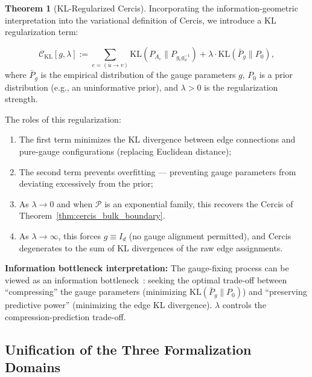 \documentclass[12pt,a4paper]{article}
\theoremstyle{definition}
\newtheorem{theorem}{Theorem}[section]
\theoremstyle{remark}
\theoremstyle{definition}
\newcommand{\cercis}{\mathcal{C}}
\newcommand{\KL}{\mathrm{KL}}
\begin{document}
\begin{theorem}[KL-Regularized Cercis]\label{thm:kl_regularized_cercis}
Incorporating the information-geometric interpretation into the variational definition of Cercis, we introduce a KL regularization term:

\[
    \cercis_{\text{KL}}[g, \lambda] := \sum_{e=(u \to v)} \KL(P_{A_e} \| P_{g_v g_u^{-1}}) + \lambda \cdot \KL(\bar{P}_g \| P_0),
\]
where $\bar{P}_g$ is the empirical distribution of the gauge parameters $g$, $P_0$ is a prior distribution (e.g., an uninformative prior),
and $\lambda > 0$ is the regularization strength.

The roles of this regularization:
\begin{enumerate}[label=(\roman*)]
    \item The first term minimizes the KL divergence between edge connections and pure-gauge configurations (replacing Euclidean distance);
    \item The second term prevents overfitting — preventing gauge parameters from deviating excessively from the prior;
    \item As $\lambda \to 0$ and when $\mathcal{P}$ is an exponential family, this recovers the Cercis of Theorem~\ref{thm:cercis_bulk_boundary}.
    \item As $\lambda \to \infty$, this forces $g \equiv I_d$ (no gauge alignment permitted),
    and Cercis degenerates to the sum of KL divergences of the raw edge assignments.
\end{enumerate}

\textbf{Information bottleneck interpretation:} The gauge-fixing process can be viewed as an information bottleneck~\cite{tishby2000}: seeking the optimal trade-off between ``compressing'' the gauge parameters (minimizing $\KL(\bar{P}_g\|P_0)$)
and ``preserving predictive power'' (minimizing the edge KL divergence).
$\lambda$ controls the compression-prediction trade-off.
\end{theorem}

\subsection{Unification of the Three Formalization Domains}
\end{document}
